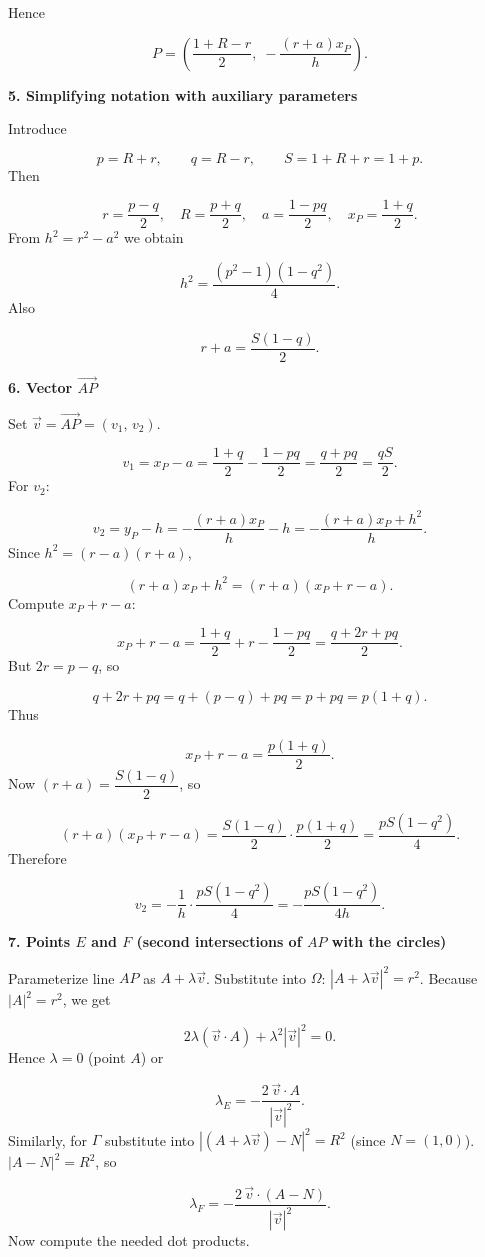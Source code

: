 \documentclass{llmxive}
\providecommand{\solutionheading}[1]{\par\smallskip\noindent\textbf{#1}\par}
\begin{document}
Hence\par
\[
P = \left(\frac{1+R-r}{2},\; -\frac{(r+a)x_P}{h}\right).
\]
\solutionheading{5. Simplifying notation with auxiliary parameters}
Introduce\par
\[
p = R + r,\qquad q = R - r,\qquad S = 1 + R + r = 1 + p.
\]
Then\par
\[
r = \frac{p - q}{2},\quad R = \frac{p + q}{2},\quad a = \frac{1 - p q}{2},\quad x_P = \frac{1 + q}{2}.
\]
From \(h^2 = r^2 - a^2\) we obtain\par
\[
h^2 = \frac{(p^2-1)(1-q^2)}{4}.
\]
Also\par
\[
r + a = \frac{S(1 - q)}{2}.
\]
\solutionheading{6. Vector \(\overrightarrow{AP}\)}
Set \(\vec{v} = \overrightarrow{AP} = (v_1,\, v_2)\).\par
\[
v_1 = x_P - a = \frac{1+q}{2} - \frac{1 - p q}{2} = \frac{q + p q}{2} = \frac{q S}{2}.
\]
For \(v_2\):\par
\[
v_2 = y_P - h = -\frac{(r+a)x_P}{h} - h = -\frac{(r+a)x_P + h^2}{h}.
\]
Since \(h^2 = (r-a)(r+a)\),\par
\[
(r+a)x_P + h^2 = (r+a)(x_P + r - a).
\]
Compute \(x_P + r - a\):\par
\[
x_P + r - a = \frac{1+q}{2} + r - \frac{1 - p q}{2} = \frac{q + 2r + p q}{2}.
\]
But \(2r = p - q\), so\par
\[
q + 2r + p q = q + (p - q) + p q = p + p q = p(1 + q).
\]
Thus\par
\[
x_P + r - a = \frac{p(1+q)}{2}.
\]
Now \((r+a) = \dfrac{S(1-q)}{2}\), so\par
\[
(r+a)(x_P + r - a) = \frac{S(1-q)}{2} \cdot \frac{p(1+q)}{2} = \frac{p S (1 - q^2)}{4}.
\]
Therefore\par
\[
v_2 = -\frac{1}{h}\cdot\frac{p S (1 - q^2)}{4} = -\frac{p S (1 - q^2)}{4h}.
\]
\solutionheading{7. Points \(E\) and \(F\) (second intersections of \(AP\) with the circles)}
Parameterize line \(AP\) as \(A + \lambda \vec{v}\). Substitute into \(\Omega\): \(|A + \lambda \vec{v}|^2 = r^2\). Because \(|A|^2 = r^2\), we get\par
\[
2\lambda (\vec{v}\cdot A) + \lambda^2 |\vec{v}|^2 = 0.
\]
Hence \(\lambda = 0\) (point \(A\)) or\par
\[
\lambda_E = -\frac{2\,\vec{v}\cdot A}{|\vec{v}|^2}.
\]
Similarly, for \(\Gamma\) substitute into \(|(A+\lambda\vec{v}) - N|^2 = R^2\) (since \(N=(1,0)\)). \(|A - N|^2 = R^2\), so\par
\[
\lambda_F = -\frac{2\,\vec{v}\cdot(A - N)}{|\vec{v}|^2}.
\]
Now compute the needed dot products.\par
\end{document}
